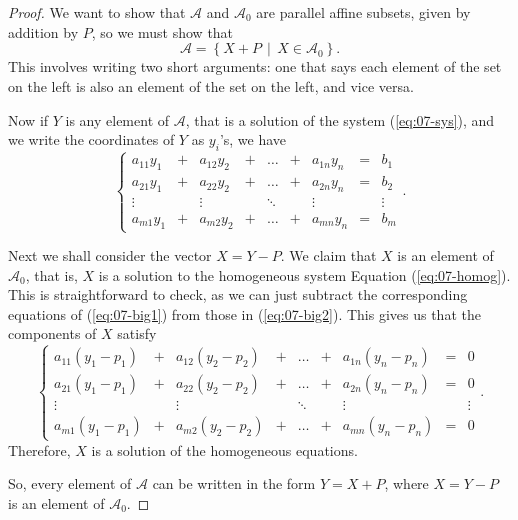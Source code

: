 \documentclass[elementsmain.tex]{subfiles}
\begin{document}
\begin{proof}
We want to show that $\mathcal{A}$ and $\mathcal{A}_0$ are parallel affine subsets, given by addition by $P$, so we must show that 
\[
\mathcal{A} = \left\{ X + P \,\middle|\, X \in \mathcal{A}_0 \right\}.
\]
This involves writing two short arguments: one that says each element of the set on the left is also an element of the set on the left, and vice versa.


Now if $Y$ is any element of $\mathcal{A}$, that is a solution of the system (\ref{eq:07-sys}), and we write the coordinates of $Y$ as $y_i$'s, we have
\begin{equation}\label{eq:07-big2}
\left\{
\begin{array}{ccccccccc}
a_{11} y_1 & + & a_{12} y_2 & + & \dots & + & a_{1n} y_n & = & b_1 \\
a_{21} y_1 & + & a_{22} y_2 & + & \dots & + & a_{2n} y_n & = & b_2 \\
\vdots     &   & \vdots     &   & \ddots &  & \vdots     &  & \vdots \\ 
a_{m1} y_1 & + & a_{m2} y_2 & + & \dots & + & a_{mn} y_n & = & b_m 
\end{array}\right..
\end{equation}

Next we shall consider the vector $X = Y - P$. We claim that $X$ is an element of $\mathcal{A}_0$, that is, $X$ is a solution to the homogeneous system Equation (\ref{eq:07-homog}). This is straightforward to check, as we can just subtract the corresponding equations of (\ref{eq:07-big1}) from those in (\ref{eq:07-big2}). This gives us that the components of $X$ satisfy
\begin{equation*}
\left\{
\begin{array}{ccccccccc}
a_{11} (y_1-p_1) & + & a_{12} (y_2-p_2) & + & \dots & + & a_{1n} (y_n-p_n) & = & 0 \\
a_{21} (y_1-p_1) & + & a_{22} (y_2-p_2) & + & \dots & + & a_{2n} (y_n-p_n) & = & 0 \\
\vdots     &   & \vdots     &   & \ddots &  & \vdots     &  & \vdots \\ 
a_{m1} (y_1-p_1) & + & a_{m2} (y_2-p_2) & + & \dots & + & a_{mn} (y_n-p_n) & = & 0 
\end{array}\right. .
\end{equation*}
Therefore, $X$ is a solution of the homogeneous equations.

So, every element of $\mathcal{A}$ can be written in the form $Y = X +P$, where $X=Y-P$ is an element of $\mathcal{A}_0$.



\end{proof}
\end{document}
